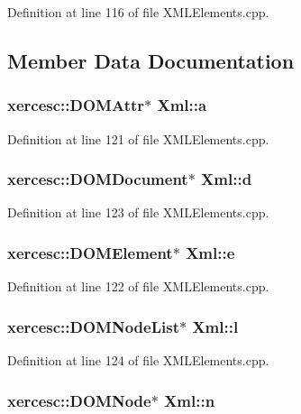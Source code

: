 Definition at line 116 of file XMLElements.cpp.

\subsection{Member Data Documentation}
\hypertarget{union_xml_a5a994b5f4b681d2f041c7c1261565c4e}{
\subsubsection[{a}]{\setlength{\rightskip}{0pt plus 5cm}xercesc::DOMAttr$\ast$ {\bf Xml::a}}}
\label{union_xml_a5a994b5f4b681d2f041c7c1261565c4e}


Definition at line 121 of file XMLElements.cpp.\hypertarget{union_xml_a3f663e54c774ae9eb843e0c8b0abd337}{
\subsubsection[{d}]{\setlength{\rightskip}{0pt plus 5cm}xercesc::DOMDocument$\ast$ {\bf Xml::d}}}
\label{union_xml_a3f663e54c774ae9eb843e0c8b0abd337}


Definition at line 123 of file XMLElements.cpp.\hypertarget{union_xml_a6d7cc65c82929e86d2f8e2b300a10624}{
\subsubsection[{e}]{\setlength{\rightskip}{0pt plus 5cm}xercesc::DOMElement$\ast$ {\bf Xml::e}}}
\label{union_xml_a6d7cc65c82929e86d2f8e2b300a10624}


Definition at line 122 of file XMLElements.cpp.\hypertarget{union_xml_ac527c7a9b99fd1748b7a33e401b7f003}{
\subsubsection[{l}]{\setlength{\rightskip}{0pt plus 5cm}xercesc::DOMNodeList$\ast$ {\bf Xml::l}}}
\label{union_xml_ac527c7a9b99fd1748b7a33e401b7f003}


Definition at line 124 of file XMLElements.cpp.\hypertarget{union_xml_a6b78aa150fc8fa96aa1ce57c01a5268d}{
\subsubsection[{n}]{\setlength{\rightskip}{0pt plus 5cm}xercesc::DOMNode$\ast$ {\bf Xml::n}}}
\label{union_xml_a6b78aa150fc8fa96aa1ce57c01a5268d}



